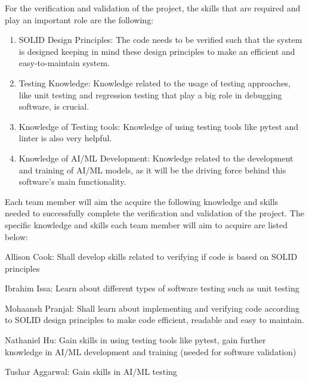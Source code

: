 \documentclass[12pt, titlepage]{article}
\begin{document}
For the verification and validation of the project, the skills that are required and play an important role are the following:
\begin{enumerate}
  \item SOLID Design Principles: The code needs to be verified such that the system is designed keeping in mind these design principles to make an efficient and easy-to-maintain system.
  \item Testing Knowledge: Knowledge related to the usage of testing approaches, like unit testing and regression testing that play a big role in debugging software, is crucial.
  \item Knowledge of Testing tools: Knowledge of using testing tools like pytest and linter is also very helpful.
  \item Knowledge of AI/ML Development: Knowledge related to the development and training of AI/ML models, as it will be the driving force behind this software's main functionality.
\end{enumerate}
Each team member will aim the acquire the following knowledge and skills needed to successfully complete the verification and validation of the project. The specific knowledge and skills each team member will aim to acquire are listed below: \\
\begin{enumerate}
    \begin{item}
        Allison Cook: Shall develop skills related to verifying if code is based on SOLID principles
    \end{item}
    \begin{item}
        Ibrahim Issa: Learn about different types of software testing such as unit testing
    \end{item}
    \begin{item}
        Mohaansh Pranjal: Shall learn about implementing and verifying code according to SOLID design principles to make code efficient, readable and easy to maintain.
    \end{item}
    \begin{item}
        Nathaniel Hu: Gain skills in using testing tools like pytest, gain further knowledge in AI/ML development and training (needed for software validation)
    \end{item}
    \begin{item}
        Tushar Aggarwal: Gain skills in AI/ML testing
    \end{item}
\end{enumerate}
\end{document}
